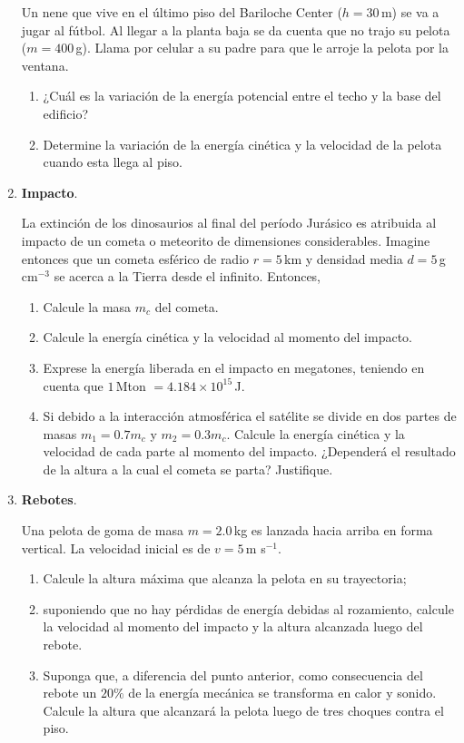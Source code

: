 \documentclass[a4paper,12pt]{article}
\begin{document}
\begin{enumerate}
Un nene que vive en el último piso del Bariloche Center ($h=30$\,m) se va a jugar al
fútbol. Al llegar a la planta baja se da cuenta que no trajo su pelota ($m=400$\,g). 
Llama por celular a su padre para que le arroje la pelota por la ventana.
\begin{enumerate}
\item ¿Cuál es la variación de la energía potencial entre el techo y la base
del edificio?
\item Determine la variación de la energía cinética y la velocidad de la pelota
cuando esta llega al piso.
\end{enumerate}

\item {\bf{Impacto}}.

La extinción de los dinosaurios al final del período Jurásico es atribuida al
impacto de un cometa o meteorito de dimensiones considerables. Imagine entonces
que un cometa esférico de radio $r=5$\,km y densidad media $d=5$\,g\,cm$^{-3}$
se acerca a la Tierra desde el infinito. Entonces,

\begin{enumerate}
\item Calcule la masa $m_c$ del cometa.
\item Calcule la energía cinética y la velocidad al momento del impacto.
\item Exprese la energía liberada en el impacto en megatones, teniendo en cuenta
que $1$\,Mton $= 4.184 \times 10^{15}$\,J.
\item Si debido a la interacción atmosférica el satélite se divide en dos partes
de masas $m_1=0.7 m_c$ y $m_2=0.3 m_c$. Calcule la energía cinética y la
velocidad de cada parte al momento del impacto. ¿Dependerá el resultado de la
altura a la cual el cometa se parta? Justifique.
\end{enumerate}

\item {\bf{Rebotes}}.

Una pelota de goma de masa $m=2.0$\,kg es lanzada hacia arriba en forma
vertical. La velocidad inicial es de $v=5$\,m s$^{-1}$.
\begin{enumerate}
\item Calcule la altura máxima que alcanza la pelota en su trayectoria;
\item suponiendo que no hay pérdidas de energía debidas al rozamiento, calcule
la velocidad al momento del impacto y la altura alcanzada luego del rebote.
\item Suponga que, a diferencia del punto anterior, como consecuencia del
rebote un $20\%$ de la energía mecánica se transforma en calor y sonido.
Calcule la altura que alcanzará la pelota luego de tres choques contra el piso.
\end{enumerate}


\end{enumerate}
\end{document}
